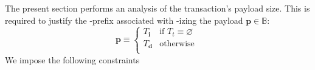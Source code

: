 \begin{center}
\end{center}
The present section performs an analysis of the transaction's payload size.
This is required to justify the \rlp{}-prefix associated with \rlp{}-izing the payload
$\textbf{p} \in \mathbb{B}$:
\label{rlp txn v2: phase constraints: payload: payload size analysis: definition of payload in terms of transaction fields}
\[
	\textbf{p} \equiv
	\begin{cases}
		T_\textbf{i} & \text{if } T_t \equiv \varnothing \\
		T_\textbf{d} & \text{otherwise }                 \\
	\end{cases}
\]
We impose the following constraints
